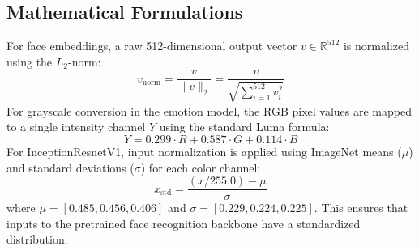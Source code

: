 \subsection{Mathematical Formulations}
For face embeddings, a raw 512-dimensional output vector $v \in \mathbb{R}^{512}$ is normalized using the $L_2$-norm:
\begin{equation}
    v_{\text{norm}} = \frac{v}{\|v\|_2} = \frac{v}{\sqrt{\sum_{i=1}^{512} v_i^2}}
\end{equation}
For grayscale conversion in the emotion model, the RGB pixel values are mapped to a single intensity channel $Y$ using the standard Luma formula:
\begin{equation}
    Y = 0.299 \cdot R + 0.587 \cdot G + 0.114 \cdot B
\end{equation}
For InceptionResnetV1, input normalization is applied using ImageNet means ($\mu$) and standard deviations ($\sigma$) for each color channel:
\begin{equation}
    x_{\text{std}} = \frac{(x / 255.0) - \mu}{\sigma}
\end{equation}
where $\mu = [0.485, 0.456, 0.406]$ and $\sigma = [0.229, 0.224, 0.225]$. This ensures that inputs to the pretrained face recognition backbone have a standardized distribution.
